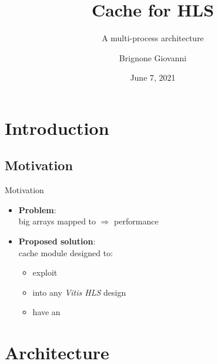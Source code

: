 \documentclass[handout]{beamer}
\title{Cache for HLS}
\subtitle{A multi-process architecture}
\author{Brignone Giovanni}
\date{June 7, 2021}
\begin{document}
\begin{frame}
	\maketitle
\end{frame}

\section{Introduction}
\subsection{Motivation}
\begin{frame}{Motivation}
	\begin{itemize}[<+->]
		\item \textbf{Problem}:\\
			big arrays mapped to  $\Rightarrow$
			performance 
		\item \textbf{Proposed solution}:\\
			cache module designed to:
			\begin{itemize}[<.->]
				\item exploit 
				\item {} into any
					\emph{Vitis HLS} design
				\item have an 
			\end{itemize}
	\end{itemize}
\end{frame}

\section{Architecture}
\end{document}
